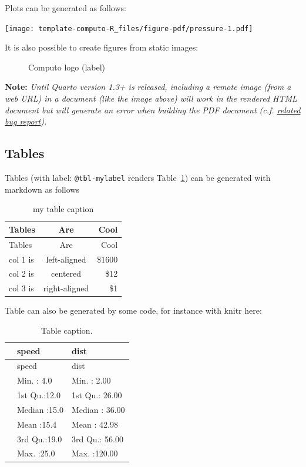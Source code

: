 \documentclass[
  11pt,
  a4paper,
]{article}
\theoremstyle{plain}
\theoremstyle{remark}
\begin{document}
Plots can be generated as follows:

\texttt{[image: template-computo-R\_files/figure-pdf/pressure-1.pdf]}

It is also possible to create figures from static images:

\begin{figure}


\caption{\label{fig-logo}Computo logo (label)}

\end{figure}%

\textbf{Note:} \emph{Until Quarto version 1.3+ is released, including a
remote image (from a web URL) in a document (like the image above) will
work in the rendered HTML document but will generate an error when
building the PDF document (c.f.
\href{https://github.com/quarto-dev/quarto-cli/issues/4443}{related bug
report}).}

\subsection{Tables}\label{tables}

Tables (with label: \texttt{@tbl-mylabel} renders
Table~\ref{tbl-mylabel}) can be generated with markdown as follows

\begin{longtable}[]{@{}lcr@{}}
\caption{my table caption}\label{tbl-mylabel}\tabularnewline
\toprule\noalign{}
Tables & Are & Cool \\
\midrule\noalign{}
\endfirsthead
\toprule\noalign{}
Tables & Are & Cool \\
\midrule\noalign{}
\endhead
\bottomrule\noalign{}
\endlastfoot
col 1 is & left-aligned & \$1600 \\
col 2 is & centered & \$12 \\
col 3 is & right-aligned & \$1 \\
\end{longtable}

Table can also be generated by some code, for instance with knitr here:

\begin{longtable}[]{@{}lll@{}}
\caption{Table caption.}\tabularnewline
\toprule\noalign{}
& speed & dist \\
\midrule\noalign{}
\endfirsthead
\toprule\noalign{}
& speed & dist \\
\midrule\noalign{}
\endhead
\bottomrule\noalign{}
\endlastfoot
& Min. : 4.0 & Min. : 2.00 \\
& 1st Qu.:12.0 & 1st Qu.: 26.00 \\
& Median :15.0 & Median : 36.00 \\
& Mean :15.4 & Mean : 42.98 \\
& 3rd Qu.:19.0 & 3rd Qu.: 56.00 \\
& Max. :25.0 & Max. :120.00 \\
\end{longtable}
\end{document}
